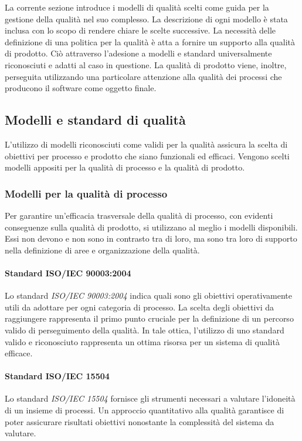 \documentclass[12pt,a4paper]{article}
\begin{document}
	La corrente sezione introduce i modelli di qualità scelti come guida per la gestione della qualità nel suo complesso. La descrizione di ogni modello è stata inclusa con lo scopo di rendere chiare le scelte successive.
	La necessità delle definizione di una politica per la qualità è atta a fornire un supporto alla qualità di prodotto. Ciò attraverso l'adesione a modelli e standard universalmente riconosciuti e adatti al caso in questione. La qualità di prodotto viene, inoltre, perseguita utilizzando una particolare attenzione alla qualità dei processi che producono il software come oggetto finale.
	
	\subsection{Modelli e standard di qualità}
	L'utilizzo di modelli riconosciuti come validi per la qualità assicura la scelta di obiettivi per processo e prodotto che siano funzionali ed efficaci. Vengono scelti modelli appositi per la qualità di processo e la qualità di prodotto.
	
	\subsubsection{Modelli per la qualità di processo}
	Per garantire un'efficacia trasversale della qualità di processo, con evidenti conseguenze sulla qualità di prodotto, si utilizzano al meglio i modelli disponibili. Essi non devono e non sono  in contrasto tra di loro, ma sono tra loro di supporto nella definizione di aree e organizzazione della qualità.
	
	\paragraph{Standard ISO/IEC 90003:2004}
	Lo standard \textit{ISO/IEC 90003:2004} indica quali sono gli obiettivi operativamente utili da adottare per ogni categoria di processo. La scelta degli obiettivi da raggiungere rappresenta il primo punto cruciale per la definizione di un percorso valido di perseguimento della qualità. In tale ottica, l'utilizzo di uno standard valido e riconosciuto rappresenta un ottima risorsa per un sistema di qualità efficace.
	
	\paragraph{Standard ISO/IEC 15504}
	Lo standard \textit{ISO/IEC 15504} fornisce gli strumenti necessari a valutare l'idoneità di un insieme di processi. Un approccio quantitativo alla qualità garantisce di poter assicurare risultati obiettivi nonostante la complessità del sistema da valutare.
	
\end{document}
